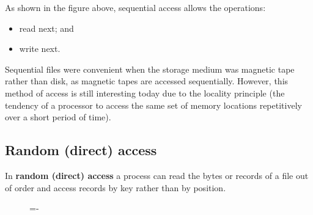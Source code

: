 \documentclass[a4paper]{systems-software}
\begin{document}
As shown in the figure above, sequential access allows the operations:
\begin{itemize}
	\item read next; and
	\item write next.
\end{itemize}

Sequential files were convenient when the storage medium was magnetic tape rather than disk, as magnetic tapes are accessed sequentially. However, this method of access is still interesting today due to the locality principle (the tendency of a processor to access the same set of memory locations repetitively over a short period of time).


\subsection*{Random (direct) access}

In \textbf{random (direct) access} a process can read the bytes or records of a file out of order and access records by key rather than by position.

\begin{figure}[H]
  \lineskip=-\fboxrule
\end{figure}
\end{document}
